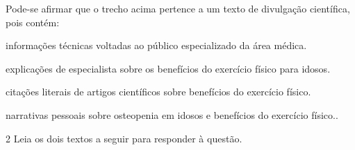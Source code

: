 
Pode-se afirmar que o trecho acima pertence a um texto de divulgação científica, pois contém:

\begin{escolha}
  
  \item informações técnicas voltadas ao público especializado da área médica.
  
  \item explicações de especialista sobre os benefícios do exercício físico para idosos.
  
  \item citações literais de artigos científicos sobre benefícios do exercício físico.
  
  \item narrativas pessoais sobre osteopenia em idosos e benefícios do exercício físico..

\end{escolha}

\num{2} Leia os dois textos a seguir para responder à questão. 

